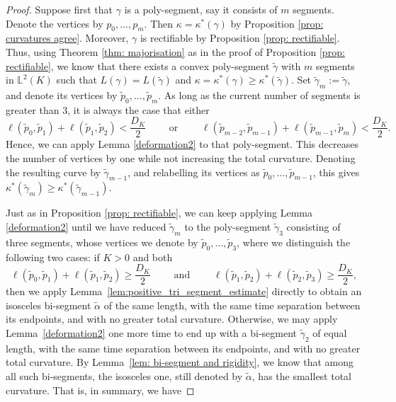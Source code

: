 \documentclass[hidelinks,12pt,a4paper]{article}
\numberwithin{equation}{section}
\theoremstyle{plain}
\theoremstyle{definition}
\newcommand{\lm}[1]{\mathbb{L}^2(#1)}
\begin{document}
\begin{proof}
Suppose first that $\gamma$ is a poly-segment, say it consists of $m$ segments. Denote the vertices
by $p_0,\ldots,p_m$. Then $\kappa=\kappa^*(\gamma)$ by Proposition \ref{prop: curvatures agree}. 
Moreover, $\gamma$ is rectifiable by Proposition \ref{prop: rectifiable}. 
Thus, using Theorem \ref{thm: majorisation} as in the proof of Proposition \ref{prop: rectifiable}, we know that there exists a convex
poly-segment $\widetilde\gamma$ with $m$ segments in $\lm K$ such that $L(\gamma)=L(\widetilde\gamma)$ and
$\kappa=\kappa^*(\gamma)\geq \kappa^*(\widetilde\gamma)$. Set
$\widetilde\gamma_m:=\widetilde\gamma$, and denote its vertices by
$\widetilde p_0,\ldots,\widetilde p_m$. As long as the current number of segments is greater than $3$, it is always the case that either
\begin{equation*}     
    \ell(\widetilde p_0,\widetilde p_1)
    +\ell(\widetilde p_1,\widetilde p_2)<\frac{D_K}{2} \qquad
    \text{ or } \qquad
    \ell(\widetilde p_{m-2},\widetilde p_{m-1})
    +\ell(\widetilde p_{m-1},\widetilde p_m)<\frac{D_K}{2}.
\end{equation*}
Hence, we can apply Lemma \ref{deformation2} to that poly-segment.
This decreases the number of vertices by one while not increasing the total curvature. Denoting
the resulting curve by $\widetilde\gamma_{m-1}$, and relabelling its vertices as
$\widetilde p_0,\ldots,\widetilde p_{m-1}$, this gives
$\kappa^*(\widetilde\gamma_m)\ge \kappa^*(\widetilde\gamma_{m-1})$.

Just as in Proposition \ref{prop: rectifiable}, we can keep applying Lemma \ref{deformation2} until  we have reduced
$\widetilde\gamma_m$ to the poly-segment $\widetilde\gamma_3$ consisting of three segments, whose
vertices we denote by $\widetilde p_0,\ldots,\widetilde p_3$, where we distinguish the following two cases:
if $K>0$ and both
\begin{equation*}
    \ell(\widetilde p_0,\widetilde p_1)
    +\ell(\widetilde p_1,\widetilde p_2)\geq \frac{D_K}{2}
    \qquad \text{ and } \qquad
    \ell(\widetilde p_1,\widetilde p_2)
    +\ell(\widetilde p_2,\widetilde p_3)\geq \frac{D_K}{2},    
\end{equation*}
then we apply Lemma~\ref{lem:positive_tri_segment_estimate} directly to obtain an isosceles bi-segment $\tilde \alpha$ of the same length, with the same time separation between its endpoints, and with no greater total curvature. 
Otherwise, we may apply Lemma~\ref{deformation2} one more time to end up with a bi-segment $\tilde\gamma_2$ of equal length, with the same time separation between its endpoints, and with no greater total curvature. 
By Lemma~\ref{lem: bi-segment and rigidity}, we know
that among all such bi-segments, the isosceles one, still denoted by $\widetilde\alpha$, has the smallest total
curvature. That is, in summary, we have


\end{proof}
\end{document}
